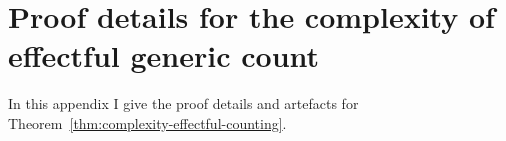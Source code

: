 \documentclass[12pt,phd,lfcs,twoside,openright,logo,leftchapter,normalheadings]{infthesis}
\theoremstyle{plain}
\theoremstyle{definition}
\begin{document}

\chapter{Proof details for the complexity of effectful generic count}
\label{sec:positive-theorem}
\newcommand{\HCount}{H_{\Count}}
\newcommand{\Henv}{\env_{\HCount}}
\newcommand{\Pure}{\dec{pure}}
\newcommand{\envt}{\dec{env}}
\newcommand{\hclo}{\chi_{\Count}}
\newcommand{\DTDT}{\dec{DT}}
\newcommand{\CF}{\dec{CF}}
\newcommand{\residual}{\dec{residual}}
\newcommand{\comp}{\dec{comp}}
\newcommand{\purecont}{\dec{purecont}}
\newcommand{\descend}[1]{\dec{env}^{\downarrow}_{#1}}
\newcommand{\ascend}[1]{\dec{env}^{\uparrow}_{#1}}
\newcommand{\initial}{\dec{env}^{\bot}}
\newcommand{\final}{\dec{env}^{\top}}
\newcommand{\ctrl}{\dec{control}}
\newcommand{\dt}{\mathcal{D}}
%
\newcommand{\arrive}{\dec{arrive}}
\newcommand{\depart}{\dec{depart}}
\newcommand{\whereX}[1]{%
  \multicolumn{2}{l}%
  {\text{where }\bl #1\el}%
}
%

In this appendix I give the proof details and artefacts for
Theorem~\ref{thm:complexity-effectful-counting}.
\end{document}
